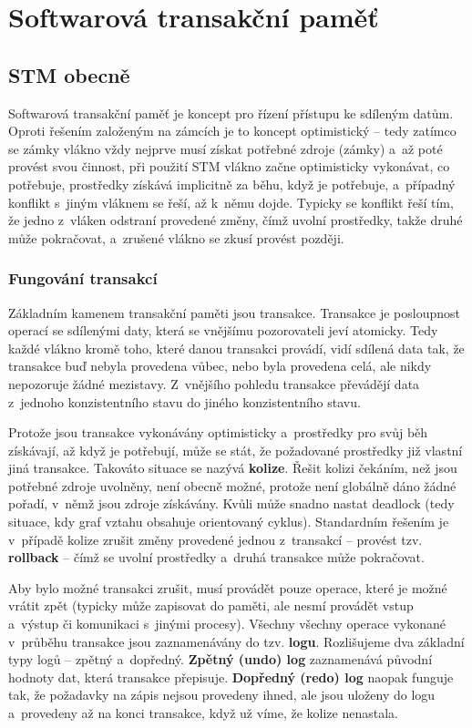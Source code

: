 \chapter{Softwarová transakční paměť}

\section{STM obecně}

Softwarová transakční paměť je koncept pro řízení přístupu ke sdíleným datům.
Oproti řešením založeným na zámcích je to koncept optimistický -- tedy zatímco
se zámky vlákno vždy nejprve musí získat potřebné zdroje (zámky) a~až poté
provést svou činnost, při použití STM vlákno začne optimisticky vykonávat, co
potřebuje, prostředky získává implicitně za běhu, když je potřebuje, a~případný
konflikt s~jiným vláknem se řeší, až k~němu dojde. Typicky se konflikt řeší tím,
že jedno z~vláken odstraní provedené změny, čímž uvolní prostředky, takže druhé
může pokračovat, a~zrušené vlákno se zkusí provést později.


\subsection{Fungování transakcí}
Základním kamenem transakční paměti jsou transakce. Transakce je posloupnost
operací se sdílenými daty, která se vnějšímu pozorovateli jeví atomicky. Tedy
každé vlákno kromě toho, které danou transakci provádí, vidí sdílená data tak,
že transakce buď nebyla provedena vůbec, nebo byla provedena celá, ale nikdy
nepozoruje žádné mezistavy. Z~vnějšího pohledu transakce převádějí data
z~jednoho konzistentního stavu do jiného konzistentního stavu.

Protože jsou transakce vykonávány optimisticky a~prostředky pro svůj běh získávají,
až když je potřebují, může se stát, že požadované prostředky již vlastní jiná transakce.
Takováto situace se nazývá {\bf kolize}. Řešit kolizi čekáním, než jsou potřebné zdroje
uvolněny, není obecně možné, protože není globálně dáno žádné pořadí, v~němž jsou
zdroje získávány. Kvůli může snadno nastat deadlock (tedy situace, kdy graf vztahu
 obsahuje orientovaný
cyklus). Standardním řešením je v~případě kolize zrušit změny provedené jednou
z~transakcí -- provést tzv. {\bf rollback} -- čímž se uvolní prostředky a~druhá
transakce může pokračovat. 

Aby bylo možné transakci zrušit, musí provádět pouze
operace, které je možné vrátit zpět (typicky může zapisovat do paměti, ale nesmí
provádět vstup a~výstup či komunikaci s~jinými procesy). Všechny všechny operace
vykonané v~průběhu transakce jsou zaznamenávány do tzv. {\bf logu}. Rozlišujeme
dva základní typy logů -- zpětný a~dopředný. {\bf Zpětný (undo) log} zaznamenává
původní hodnoty dat, která transakce přepisuje. {\bf Dopředný (redo) log} naopak
funguje tak, že požadavky na zápis nejsou provedeny ihned, ale jsou uloženy do logu
a~provedeny až na konci transakce, když už víme, že kolize nenastala.

